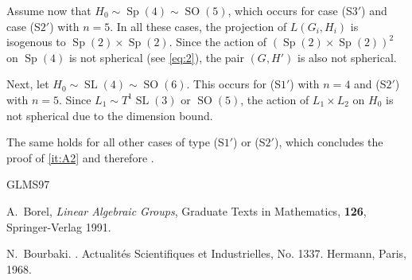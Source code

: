 \documentclass[12pt]{amsart}
\newcommand\SL{\operatorname{SL}}
\newcommand\Sp{\operatorname{Sp}}
\newcommand\SOO{\operatorname{SO}}
\numberwithin{equation}{section}
\theoremstyle{definition}
\begin{document}
Assume now that $H_0\sim\Sp(4)\sim\SOO(5)$, which occurs for case (S$3'$) and
case (S$2'$) with $n=5$. In all these cases, the projection of $L(G_i,H_i)$
is isogenous to $\Sp(2)\times\Sp(2)$. Since the action of
$(\Sp(2)\times\Sp(2))^2$ on $\Sp(4)$ is not spherical (see \eqref{eq:2}),
the pair $(G,H')$ is also not spherical.

Next, let $H_0\sim\SL(4)\sim\SOO(6)$. This occurs for (S$1'$) with
$n=4$ and (S$2'$) with $n=5$. Since $L_1\sim T^1\SL(3)$ or
$\SOO(5)$, the action of $L_1\times L_2$ on $H_0$ is not spherical due
to the dimension bound.

The same holds for all other cases of type (S$1'$) or (S$2'$), which concludes the proof of \ref{it:A2} and therefore .


\begin{thebibliography}{GLMS97}

  \newcommand{\etalchar}[1]{$^{#1}$}
  \providecommand{\bysame}{\leavevmode\hbox
    to3em{\hrulefill}\thinspace}
  \providecommand{\MR}{\relax\ifhmode\unskip\space\fi MR }
  \providecommand{\MRhref}[2]{%
    \href{http://www.ams.org/mathscinet-getitem?mr=#1}{#2} }
  \providecommand{\href}[2]{#2}







 A.~Borel, \emph{Linear Algebraic Groups},
  Graduate Texts in Mathematics, \textbf{126}, Springer-Verlag 1991.


 N.~Bourbaki.
  .
  \newblock Actualités Scientifiques et Industrielles,
  No. 1337. Hermann, Paris, 1968.


\end{thebibliography}
\end{document}
